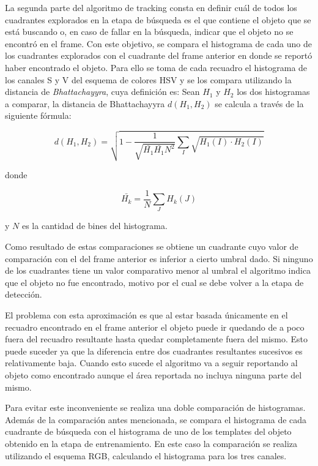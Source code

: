 La segunda parte del algoritmo de tracking consta en definir cuál de todos los cuadrantes explorados en la etapa de búsqueda es el que contiene el objeto que se está buscando o, en caso de fallar en la búsqueda, indicar que el objeto no se encontró en el frame. Con este objetivo, se compara el histograma de cada uno de los cuadrantes explorados con el cuadrante del frame anterior en donde se reportó haber encontrado el objeto. Para ello se toma de cada recuadro el histograma de los canales S y V del esquema de colores HSV y se los compara utilizando la distancia de \textit{Bhattachayyra}, cuya definición es: Sean $H_1$ y $H_2$ los dos histogramas a comparar, la distancia de Bhattachayyra $d(H_1, H_2)$ se calcula a través de la siguiente fórmula:

\begin{equation}
	d(H_1, H_2) = \sqrt{1 - \frac{1}{\sqrt{\bar{H_1} \bar{H_1} N^2}} \sum_I \sqrt{H_1(I) \cdot H_2(I)}}
\end{equation}

donde

$$
	\bar{H_k} = \frac{1}{N} \sum_J H_k(J)
$$

y $N$ es la cantidad de bines del histograma.

Como resultado de estas comparaciones se obtiene un cuadrante cuyo valor de comparación con el del frame anterior es inferior a cierto umbral dado. Si ninguno de los cuadrantes tiene un valor comparativo menor al umbral el algoritmo indica que el objeto no fue encontrado, motivo por el cual se debe volver a la etapa de detección.

El problema con esta aproximación es que al estar basada únicamente en el recuadro encontrado en el frame anterior el objeto puede ir quedando de a poco fuera del recuadro resultante hasta quedar completamente fuera del mismo. Esto puede suceder ya que la diferencia entre dos cuadrantes resultantes sucesivos es relativamente baja. Cuando esto sucede el algoritmo va a seguir reportando al objeto como encontrado aunque el área reportada no incluya ninguna parte del mismo.

Para evitar este inconveniente se realiza una doble comparación de histogramas. Además de la comparación antes mencionada, se compara el histograma de cada cuadrante de búsqueda con el histograma de uno de los templates del objeto obtenido en la etapa de entrenamiento. En este caso la comparación se realiza utilizando el esquema RGB, calculando el histograma para los tres canales.


